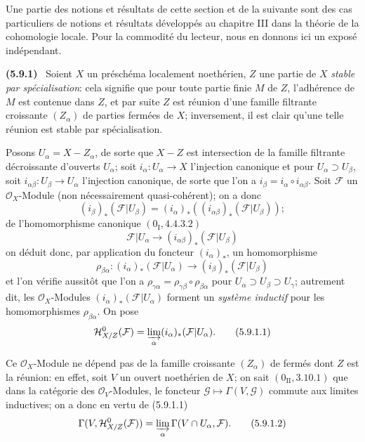 \documentclass[10pt,oneside]{book}
\newenvironment{env}[1][]{\par\medskip\noindent\textbf{(#1)}\ }{\par}
\begin{document}
Une partie des notions et résultats de cette section et de la suivante sont des
cas particuliers de notions et résultats développés au chapitre III dans la
théorie de la cohomologie locale. Pour la commodité du lecteur, nous en donnons
ici un exposé indépendant.

\begin{env}[5.9.1]
\label{IV.2.s5.9.1-fr}
Soient $X$ un préschéma localement noethérien, $Z$ une partie de $X$
\emph{stable par spécialisation}: cela signifie que pour toute partie finie
$M$ de $Z$, l'adhérence de $M$ est contenue dans $Z$, et par suite $Z$ est
réunion d'une famille filtrante croissante $(Z_\alpha)$ de parties fermées de
$X$; inversement, il est clair qu'une telle réunion est stable par
spécialisation.

Posons $U_\alpha=X-Z_\alpha$, de sorte que $X-Z$ est intersection de la
famille filtrante décroissante d'ouverts $U_\alpha$; soit
$i_\alpha:U_\alpha\to X$ l'injection canonique et pour
$U_\alpha\supset U_\beta$, soit $i_{\alpha\beta}:U_\beta\to U_\alpha$
l'injection canonique, de sorte que l'on a
$i_\beta=i_\alpha\circ i_{\alpha\beta}$. Soit $\mathcal F$ un
$\mathcal O_X$-Module (non nécessairement quasi-cohérent); on a donc
\[
(i_\beta)_*(\mathcal F|U_\beta)
=(i_\alpha)_*((i_{\alpha\beta})_*(\mathcal F|U_\beta));
\]
de l'homomorphisme canonique $(0_{\mathrm I},4.4.3.2)$
\[
\mathcal F|U_\alpha\longrightarrow
(i_{\alpha\beta})_*(\mathcal F|U_\beta)
\]
on déduit donc, par application du foncteur $(i_\alpha)_*$, un homomorphisme
\[
\rho_{\beta\alpha}:(i_\alpha)_*(\mathcal F|U_\alpha)
\longrightarrow(i_\beta)_*(\mathcal F|U_\beta)
\]
et l'on vérifie aussitôt que l'on a
$\rho_{\gamma\alpha}=\rho_{\gamma\beta}\circ\rho_{\beta\alpha}$ pour
$U_\alpha\supset U_\beta\supset U_\gamma$; autrement dit, les
$\mathcal O_X$-Modules $(i_\alpha)_*(\mathcal F|U_\alpha)$ forment un
\emph{système inductif} pour les homomorphismes $\rho_{\beta\alpha}$.
On pose
\begin{equation}
\mathcal H^0_{X/Z}(\mathcal F)
=\varinjlim_\alpha(i_\alpha)_*(\mathcal F|U_\alpha).
\tag{5.9.1.1}\label{IV.2.s5.9.1.1-fr}
\end{equation}

Ce $\mathcal O_X$-Module ne dépend pas de la famille croissante
$(Z_\alpha)$ de fermés dont $Z$ est la réunion: en effet, soit $V$ un ouvert
noethérien de $X$; on sait $(0_{\mathrm{II}},3.10.1)$ que dans la catégorie
des $\mathcal O_V$-Modules, le foncteur
$\mathcal G\mapsto\Gamma(V,\mathcal G)$ commute aux limites inductives; on a
donc en vertu de (5.9.1.1)
\begin{equation}
\Gamma(V,\mathcal H^0_{X/Z}(\mathcal F))
=\varinjlim_\alpha\Gamma(V\cap U_\alpha,\mathcal F).
\tag{5.9.1.2}\label{IV.2.s5.9.1.2-fr}
\end{equation}


\end{env}
\end{document}
